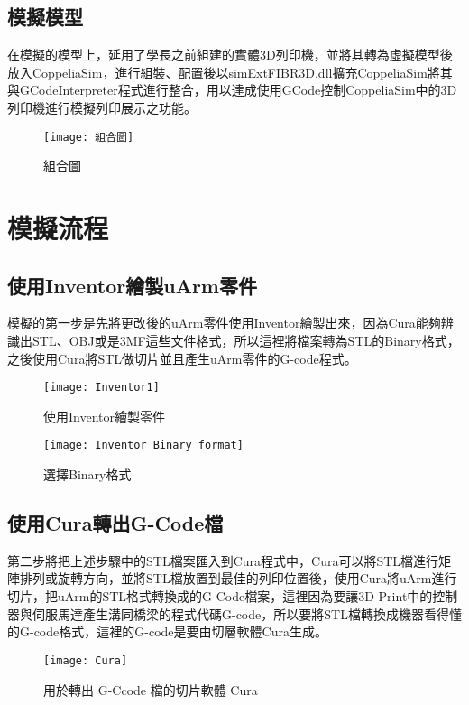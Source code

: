  \subsection{模擬模型}
 在模擬的模型上，延用了學長之前組建的實體3D列印機，並將其轉為虛擬模型後放入CoppeliaSim，進行組裝、配置後以simExtFIBR3D.dll擴充CoppeliaSim將其與GCodeInterpreter程式進行整合，用以達成使用GCode控制CoppeliaSim中的3D列印機進行模擬列印展示之功能。\\
\begin{figure}
\center
\texttt{[image: 組合圖]}
\caption{\Large 組合圖}
\label{組合圖}
\end{figure}


\section{模擬流程}


\subsection{使用Inventor繪製uArm零件}
 模擬的第一步是先將更改後的uArm零件使用Inventor繪製出來，因為Cura能夠辨識出STL、OBJ或是3MF這些文件格式，所以這裡將檔案轉為STL的Binary格式，之後使用Cura將STL做切片並且產生uArm零件的G-code程式。\\
\begin{figure}
\begin{center}
\texttt{[image: Inventor1]}
\caption{\Large 使用Inventor繪製零件}\label{Inventor1}
\end{center}

\begin{center}
\texttt{[image: Inventor Binary format]}
\caption{\Large 選擇Binary格式}\label{Inventor Binary format}
\end{center}
\end{figure}

\subsection{使用Cura轉出G-Code檔}
 第二步將把上述步驟中的STL檔案匯入到Cura程式中，Cura可以將STL檔進行矩陣排列或旋轉方向，並將STL檔放置到最佳的列印位置後，使用Cura將uArm進行切片，把uArm的STL格式轉換成的G-Code檔案，這裡因為要讓3D Print中的控制器與伺服馬達產生溝同橋梁的程式代碼G-code，所以要將STL檔轉換成機器看得懂的G-code格式，這裡的G-code是要由切層軟體Cura生成。\\
\begin{figure}
\begin{center}
\texttt{[image: Cura]}
\caption{\Large 用於轉出 G-Ccode 檔的切片軟體 Cura}\label{Cura}
\end{center}
\end{figure}

